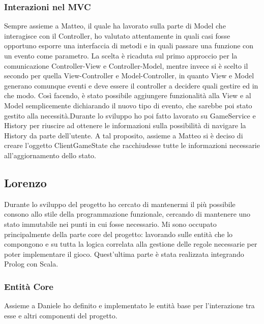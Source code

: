 \subsubsection{Interazioni nel MVC}
Sempre assieme a Matteo, il quale ha lavorato sulla parte di Model che interagisce con il Controller, ho valutato attentamente in quali casi fosse opportuno esporre una interfaccia di metodi e in quali passare una funzione con un evento come parametro. La scelta è ricaduta sul primo approccio per la comunicazione Controller-View e Controller-Model, mentre invece si è scelto il secondo per quella View-Controller e Model-Controller, in quanto View e Model generano comunque eventi e deve essere il controller a decidere quali gestire ed in che modo. Così facendo, è stato possibile aggiungere funzionalità alla View e al Model semplicemente dichiarando il nuovo tipo di evento, che sarebbe poi stato gestito alla necessità.\newline \newline Durante lo sviluppo ho poi fatto lavorato su GameService e History per riuscire ad ottenere le informazioni sulla possibilità di navigare la History da parte dell’utente. A tal proposito, assieme a Matteo si è deciso di creare l’oggetto ClientGameState che racchiudesse tutte le informazioni necessarie all’aggiornamento dello stato.
\subsection{Lorenzo}
Durante lo sviluppo del progetto ho cercato di mantenermi il più possibile consono allo stile della programmazione funzionale, cercando di mantenere uno stato immutabile nei punti in cui fosse necessario. Mi sono occupato principalmente della parte core del progetto: lavorando sulle entità che lo compongono e su tutta la logica correlata alla gestione delle regole necessarie per poter implementare il gioco. Quest’ultima parte è stata realizzata integrando Prolog con Scala.
\subsubsection{Entità Core}
Assieme a Daniele ho definito e implementato le entità base per l’interazione tra esse e altri componenti del progetto.
